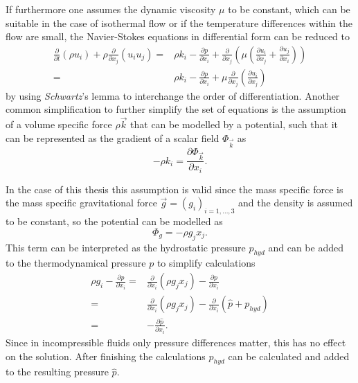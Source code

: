       If furthermore one assumes the dynamic viscosity \(\mu\) to be constant,  which can be suitable in the case of isothermal flow or if the temperature differences within the flow are small, the Navier-Stokes equations in differential form can be reduced to 
      \begin{subequations}
        \label{eq:navierstokes}
      \begin{align}
        \frac{\partial}{\partial t}   \left(\rho u_i \right)
        + \rho \frac{\partial}{\partial x_j} \left( u_i  u_j \right) 
        =& \rho k_i
        - \frac{\partial p}{\partial x_i}
      + \frac{\partial}{\partial x_j} \left( \mu  \left( \frac{\partial u_i}{\partial x_j} 
      + \frac{\partial u_j}{\partial x_i} \right) \right) \\[0.5em]
        =& \rho k_i
        - \frac{\partial p}{\partial x_i}
        + \mu \frac{\partial}{\partial x_j} \left( \frac{\partial u_i}{\partial x_j} \right)
      \end{align}
    \end{subequations}
      by using \emph{Schwartz}'s lemma to interchange the order of differentiation. Another common simplification to further simplify the set of equations is the assumption of a volume specific force \(\rho \vec{k}\) that can be modelled by a potential, such that it can be represented as the gradient of a scalar field \(\Phi_\vec{k}\) as
      \begin{displaymath}
       - \rho k_i = \frac{\partial \Phi_\vec{k}}{\partial x_i}.
      \end{displaymath}

      In the case of this thesis this assumption is valid since the mass specific force is the mass specific gravitational force \(\vec{g} = \left( g_i \right)_{i = 1,\dots,3}\) and the density is assumed to be constant, so the potential can be modelled as
      \begin{displaymath}
        \Phi_g = - \rho g_j x_j.
      \end{displaymath}
      This term can be interpreted as the hydrostatic pressure \(p_{hyd}\) and can be added to the thermodynamical pressure \(p\) to simplify calculations 
      \begin{align}
        \rho g_i - \frac{\partial p}{\partial x_i} 
        =& \frac{\partial}{\partial x_i} \left( \rho g_j x_j \right) - \frac{\partial p}{\partial x_i} \nonumber \\[0.5em]
        =& \frac{\partial}{\partial x_i} \left( \rho g_j x_j \right) - \frac{\partial}{\partial x_i}  \left(\hat{p} + p_{hyd} \right) \nonumber \\[0.5em]
        =& - \frac{\partial \hat{p}}{\partial x_i}.
      \end{align}
      Since in incompressible fluids only pressure differences matter, this has no effect on the solution. After finishing the calculations \(p_{hyd}\) can be calculated and added to the resulting pressure \(\hat{p}\).

